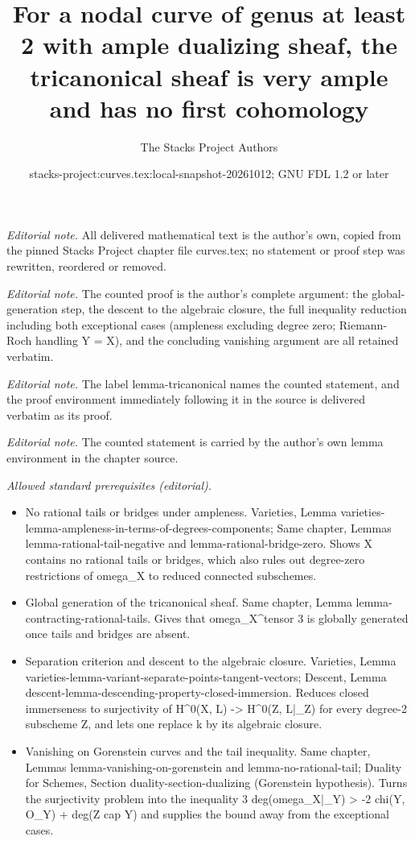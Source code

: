 \documentclass[10pt,a4paper]{amsart}
\title{For a nodal curve of genus at least 2 with ample dualizing sheaf, the tricanonical sheaf is very ample and has no first cohomology}
\author{The Stacks Project Authors}
\date{stacks-project:curves.tex:local-snapshot-20261012; GNU FDL 1.2 or later}
\theoremstyle{plain}
\theoremstyle{definition}
\theoremstyle{remark}
\numberwithin{equation}{subsection}
\begin{document}
\maketitle
\noindent\textit{Editorial note.} All delivered mathematical text is the author's own, copied from the pinned Stacks Project chapter file curves.tex; no statement or proof step was rewritten, reordered or removed.\par\medskip
\noindent\textit{Editorial note.} The counted proof is the author's complete argument: the global-generation step, the descent to the algebraic closure, the full inequality reduction including both exceptional cases (ampleness excluding degree zero; Riemann-Roch handling Y = X), and the concluding vanishing argument are all retained verbatim.\par\medskip
\noindent\textit{Editorial note.} The label lemma-tricanonical names the counted statement, and the proof environment immediately following it in the source is delivered verbatim as its proof.\par\medskip
\noindent\textit{Editorial note.} The counted statement is carried by the author's own lemma environment in the chapter source.\par\medskip
\noindent\textit{Allowed standard prerequisites (editorial).}\begin{itemize}
\item No rational tails or bridges under ampleness. Varieties, Lemma varieties-lemma-ampleness-in-terms-of-degrees-components; Same chapter, Lemmas lemma-rational-tail-negative and lemma-rational-bridge-zero. Shows X contains no rational tails or bridges, which also rules out degree-zero restrictions of omega\_X to reduced connected subschemes.
\item Global generation of the tricanonical sheaf. Same chapter, Lemma lemma-contracting-rational-tails. Gives that omega\_X\textasciicircum{}tensor 3 is globally generated once tails and bridges are absent.
\item Separation criterion and descent to the algebraic closure. Varieties, Lemma varieties-lemma-variant-separate-points-tangent-vectors; Descent, Lemma descent-lemma-descending-property-closed-immersion. Reduces closed immerseness to surjectivity of H\textasciicircum{}0(X, L) -> H\textasciicircum{}0(Z, L|\_Z) for every degree-2 subscheme Z, and lets one replace k by its algebraic closure.
\item Vanishing on Gorenstein curves and the tail inequality. Same chapter, Lemmas lemma-vanishing-on-gorenstein and lemma-no-rational-tail; Duality for Schemes, Section duality-section-dualizing (Gorenstein hypothesis). Turns the surjectivity problem into the inequality 3 deg(omega\_X|\_Y) > -2 chi(Y, O\_Y) + deg(Z cap Y) and supplies the bound away from the exceptional cases.
\end{itemize}\medskip
\end{document}
